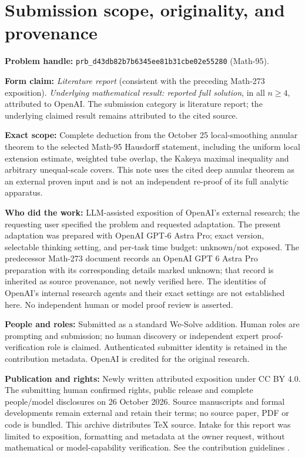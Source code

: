 \documentclass[11pt,a4paper]{article}
\numberwithin{equation}{section}
\theoremstyle{definition}
\theoremstyle{remark}
\begin{document}
\section{Submission scope, originality, and provenance}
\label{sec:metadata}
\noindent\textbf{Problem handle:}
\texttt{prb\_d43db82b7b6345ee81b31cbe02e55280} (Math-95).

\noindent\textbf{Form claim:} \emph{Literature report} (consistent
with the preceding Math-273 exposition). \emph{Underlying mathematical
result: reported full solution}, in all $n\ge4$, attributed to OpenAI.
The submission category is literature report; the underlying claimed result remains attributed to the cited source.

\noindent\textbf{Exact scope:} Complete deduction from the
October 25 local-smoothing annular theorem to the selected Math-95
Hausdorff statement, including the uniform local extension estimate,
weighted tube overlap, the Kakeya maximal inequality and arbitrary
unequal-scale covers. This note uses the cited deep annular theorem
as an external proven input and is not an independent re-proof of
its full analytic apparatus.

\noindent\textbf{Who did the work:} LLM-assisted exposition of
OpenAI's external research; the requesting user specified the
problem and requested adaptation. The present adaptation was
prepared with OpenAI GPT-6 Astra Pro; exact version, selectable thinking
setting, and per-task time budget: unknown/not exposed. The
predecessor Math-273 document records an OpenAI GPT 6 Astra Pro
preparation with its corresponding details marked unknown; that
record is inherited as source provenance, not newly verified here.
The identities of OpenAI's internal research agents and their exact
settings are not established here. No independent human or model
proof review is asserted.

\noindent\textbf{People and roles:} Submitted as a standard We-Solve addition. Human roles are prompting and submission; no human discovery or independent expert proof-verification role is claimed. Authenticated submitter identity is retained in the contribution metadata. OpenAI is credited for the original research.

\noindent\textbf{Publication and rights:} Newly written attributed exposition under CC BY 4.0. The submitting human confirmed rights, public release and complete people/model disclosures on 26 October 2026. Source manuscripts and formal developments remain external and retain their terms; no source paper, PDF or code is bundled. This archive distributes TeX source. Intake for this report was limited to exposition, formatting and metadata at the owner request, without mathematical or model-capability verification. See the contribution guidelines \cite{guidelines}.
\end{document}
